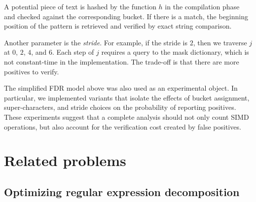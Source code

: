 A potential piece of text is hashed by the function $h$ in the compilation phase and checked against the corresponding bucket. If there is a match, the beginning position of the pattern is retrieved and verified by exact string comparison.

Another parameter is the \textit{stride}. For example, if the stride is $2$, then we traverse $j$ at $0$, $2$, $4$, and $6$. Each step of $j$ requires a query to the mask dictionary, which is not constant-time in the implementation. The trade-off is that there are more positives to verify.

The simplified FDR model above was also used as an experimental object. In particular, we implemented variants that isolate the effects of bucket assignment, super-characters, and stride choices on the probability of reporting positives. These experiments suggest that a complete analysis should not only count SIMD operations, but also account for the verification cost created by false positives.


\section{Related problems}

\subsection{Optimizing regular expression decomposition}

